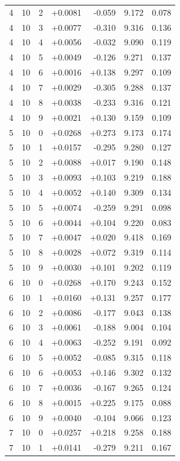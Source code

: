 \documentclass[10pt]{article}
\begin{document}
\begin{longtable}{llrrrrr}
4 & 10 & 2 & +0.0081 & -0.059 & 9.172 & 0.078 \\
4 & 10 & 3 & +0.0077 & -0.310 & 9.316 & 0.136 \\
4 & 10 & 4 & +0.0056 & -0.032 & 9.090 & 0.119 \\
4 & 10 & 5 & +0.0049 & -0.126 & 9.271 & 0.137 \\
4 & 10 & 6 & +0.0016 & +0.138 & 9.297 & 0.109 \\
4 & 10 & 7 & +0.0029 & -0.305 & 9.288 & 0.137 \\
4 & 10 & 8 & +0.0038 & -0.233 & 9.316 & 0.121 \\
4 & 10 & 9 & +0.0021 & +0.130 & 9.159 & 0.109 \\
5 & 10 & 0 & +0.0268 & +0.273 & 9.173 & 0.174 \\
5 & 10 & 1 & +0.0157 & -0.295 & 9.280 & 0.127 \\
5 & 10 & 2 & +0.0088 & +0.017 & 9.190 & 0.148 \\
5 & 10 & 3 & +0.0093 & +0.103 & 9.219 & 0.188 \\
5 & 10 & 4 & +0.0052 & +0.140 & 9.309 & 0.134 \\
5 & 10 & 5 & +0.0074 & -0.259 & 9.291 & 0.098 \\
5 & 10 & 6 & +0.0044 & +0.104 & 9.220 & 0.083 \\
5 & 10 & 7 & +0.0047 & +0.020 & 9.418 & 0.169 \\
5 & 10 & 8 & +0.0028 & +0.072 & 9.319 & 0.114 \\
5 & 10 & 9 & +0.0030 & +0.101 & 9.202 & 0.119 \\
6 & 10 & 0 & +0.0268 & +0.170 & 9.243 & 0.152 \\
6 & 10 & 1 & +0.0160 & +0.131 & 9.257 & 0.177 \\
6 & 10 & 2 & +0.0086 & -0.177 & 9.043 & 0.138 \\
6 & 10 & 3 & +0.0061 & -0.188 & 9.004 & 0.104 \\
6 & 10 & 4 & +0.0063 & -0.252 & 9.191 & 0.092 \\
6 & 10 & 5 & +0.0052 & -0.085 & 9.315 & 0.118 \\
6 & 10 & 6 & +0.0053 & +0.146 & 9.302 & 0.132 \\
6 & 10 & 7 & +0.0036 & -0.167 & 9.265 & 0.124 \\
6 & 10 & 8 & +0.0015 & +0.225 & 9.175 & 0.088 \\
6 & 10 & 9 & +0.0040 & -0.104 & 9.066 & 0.123 \\
7 & 10 & 0 & +0.0257 & +0.218 & 9.258 & 0.188 \\
7 & 10 & 1 & +0.0141 & -0.279 & 9.211 & 0.167 \\

\end{longtable}
\end{document}
